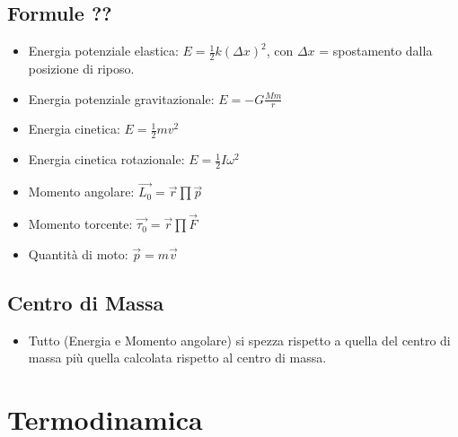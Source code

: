 \documentclass[a4paper,11pt]{article}
\begin{document}
\subsection*{Formule ??}
\begin{itemize}
\item Energia potenziale elastica: $E = \frac{1}{2}k(\Delta x)^2$, con $\Delta x$ = spostamento dalla posizione di riposo.
\item Energia potenziale gravitazionale: $E = -G\frac{Mm}{r}$
\item Energia cinetica: $E = \frac{1}{2}mv^2$
\item Energia cinetica rotazionale: $E = \frac{1}{2}I\omega^2$
\item Momento angolare: $\vec{L_0} = \vec{r}\prod\vec{p}$
\item Momento torcente: $\vec{\tau_0} = \vec{r}\prod\vec{F}$
\item Quantit\`a di moto: $\vec{p} = m\vec{v}$
\end{itemize}

\subsection*{Centro di Massa}
\begin{itemize}
\item Tutto (Energia e Momento angolare) si spezza rispetto a quella del centro di massa pi\`u quella calcolata rispetto al centro di massa.
\end{itemize}

\section*{Termodinamica}
\end{document}
